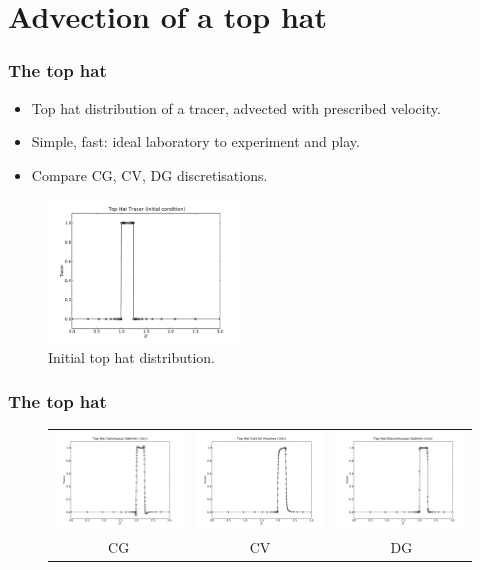 
%

\section{Advection of a top hat}

\begin{frame}
  \frametitle{The top hat}
  \begin{itemize}
  \item Top hat distribution of a tracer, advected with prescribed velocity.
  \item Simple, fast: ideal laboratory to experiment and play.
  \item Compare CG, CV, DG discretisations.
  \end{itemize}

  \begin{figure}
    \centering
    \includegraphics[width=0.45\textwidth]{./top_hat/top_hat_ic.pdf}
    \caption{Initial top hat distribution.}
  \end{figure}
\end{frame}

\begin{frame}
  \frametitle{The top hat}
  \begin{figure}[ht]
    \begin{tabular}{ccc}
      \includegraphics[width=3.5cm]{./top_hat/top_hat_cg.pdf} &
      \includegraphics[width=3.5cm]{./top_hat/top_hat_cv.pdf} &
      \includegraphics[width=3.5cm]{./top_hat/top_hat_dg.pdf} \\
      CG & CV & DG
    \end{tabular}
  \end{figure}
\end{frame}

